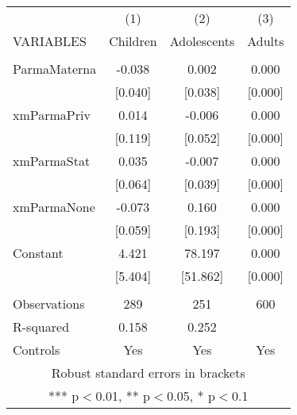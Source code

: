 \begin{tabular}{lccc} \hline
 & (1) & (2) & (3) \\
VARIABLES & Children & Adolescents & Adults \\ \hline
 &  &  &  \\
ParmaMaterna & -0.038 & 0.002 & 0.000 \\
 & [0.040] & [0.038] & [0.000] \\
xmParmaPriv & 0.014 & -0.006 & 0.000 \\
 & [0.119] & [0.052] & [0.000] \\
xmParmaStat & 0.035 & -0.007 & 0.000 \\
 & [0.064] & [0.039] & [0.000] \\
xmParmaNone & -0.073 & 0.160 & 0.000 \\
 & [0.059] & [0.193] & [0.000] \\
Constant & 4.421 & 78.197 & 0.000 \\
 & [5.404] & [51.862] & [0.000] \\
 &  &  &  \\
Observations & 289 & 251 & 600 \\
R-squared & 0.158 & 0.252 &  \\
 Controls & Yes & Yes & Yes \\ \hline
\multicolumn{4}{c}{ Robust standard errors in brackets} \\
\multicolumn{4}{c}{ *** p$<$0.01, ** p$<$0.05, * p$<$0.1} \\
\end{tabular}
